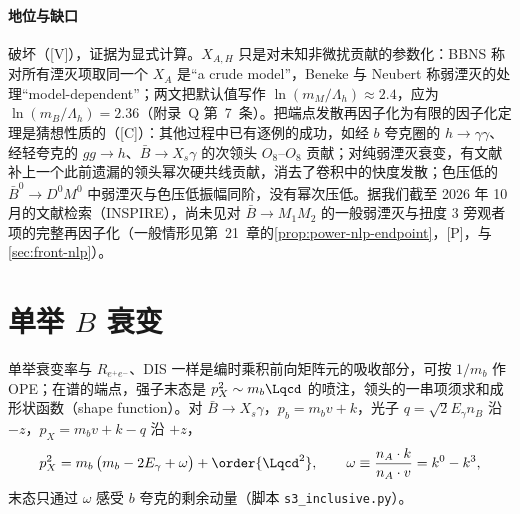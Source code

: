 \paragraph{地位与缺口}
破坏（[V]），证据为显式计算。$X_{A,H}$ 只是对未知非微扰贡献的参数化：BBNS 称对所有湮灭项取同一个 $X_A$ 是“a crude model”\cite{BenekeEtAl2001}，Beneke 与 Neubert 称弱湮灭的处理“model-dependent”\cite{BenekeNeubert2003}；两文把默认值写作 $\ln(m_M/\Lambda_h)\approx2.4$，应为 $\ln(m_B/\Lambda_h)=2.36$（附录~Q 第~7~条）。把端点发散再因子化为有限的因子化定理是猜想性质的（[C]）：其他过程中已有逐例的成功，如经 $b$ 夸克圈的 $h\to\gamma\gamma$\cite{Liu:2019oav,Liu:2020wbn}、经轻夸克的 $gg\to h$\cite{Liu:2022ajh}、$\bar B\to X_s\gamma$ 的次领头 $O_8$--$O_8$ 贡献\cite{Hurth:2023paz}；对纯弱湮灭衰变，有文献补上一个此前遗漏的领头幂次硬共线贡献，消去了卷积中的快度发散\cite{Lu:2022kos}；色压低的 $\bar B^0\to D^0M^0$ 中弱湮灭与色压低振幅同阶，没有幂次压低\cite{Mantry:2003uz}。据我们截至 2026 年 10 月的文献检索（INSPIRE），尚未见对 $\bar B\to M_1M_2$ 的一般弱湮灭与扭度 3 旁观者项的完整再因子化（一般情形见第~21~章的\cref{prop:power-nlp-endpoint}，[P]，与\cref{sec:front-nlp}）。

\section{单举 $B$ 衰变}\label{sec:heavy-inclusive}

单举衰变率与 $R_{e^+e^-}$、DIS 一样是编时乘积前向矩阵元的吸收部分，可按 $1/m_b$ 作 OPE；在谱的端点，强子末态是 $p_X^2\sim m_b\Lqcd$ 的喷注，领头的一串项须求和成形状函数（shape function）。对 $\bar B\to X_s\gamma$，$p_b=m_bv+k$，光子 $q=\sqrt2E_\gamma n_B$ 沿 $-z$，$p_X=m_bv+k-q$ 沿 $+z$，
\begin{equation}\label{eq:heavy-pX2}
p_X^2=m_b\,\big(m_b-2E_\gamma+\omega\big)+\order{\Lqcd^2},\qquad \omega\equiv\frac{n_A\cdot k}{n_A\cdot v}=k^0-k^3 ,
\end{equation}
末态只通过 $\omega$ 感受 $b$ 夸克的剩余动量（脚本 \texttt{s3\_\allowbreak inclusive.py}）。

